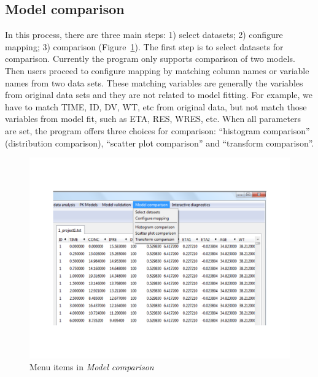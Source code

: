 \documentclass[a4paper]{article}
\begin{document}
\subsection{Model comparison}
In this process, there are three main steps: 1) select datasets; 2) configure mapping; 3) comparison (Figure~\ref{modelc}). The first step is to select datasets for comparison. Currently the program only supports comparison of two models. Then users proceed to configure mapping by matching column names or variable names from two data sets. These matching variables are generally the variables from original data sets and they are not related to model fitting. For example, we have to match TIME, ID, DV, WT, etc from original data, but not match those variables from model fit, such as ETA, RES, WRES, etc. When all parameters are set, the program offers three choices for comparison: ``histogram comparison'' (distribution comparison), ``scatter plot comparison'' and ``transform comparison''.\begin{figure}[h!tb] \centering
\includegraphics[scale=0.6]{modelc.pdf}
\caption{Menu items in \textit{Model comparison}}
\label{modelc}
\end{figure}
\end{document}
